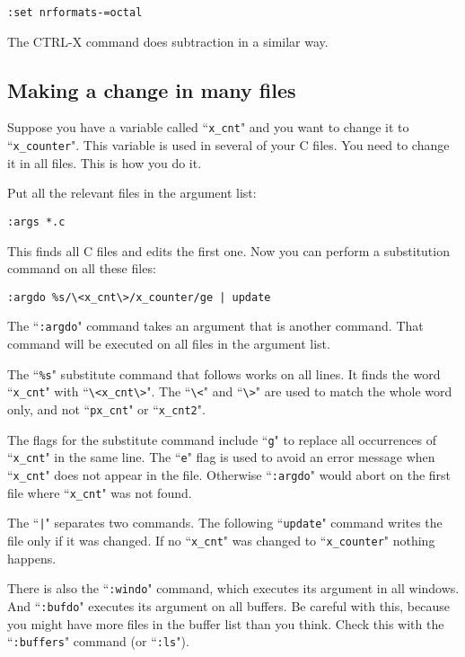 \begin{Verbatim}[samepage=true]
 :set nrformats-=octal
\end{Verbatim}

The CTRL-X command does subtraction in a similar way.
\subsection{Making a change in many files}
Suppose you have a variable called ``\texttt{x\_cnt}" and you want to change it to ``\texttt{x\_counter}".
This variable is used in several of your C files.
You need to change it in all files.
This is how you do it.

Put all the relevant files in the argument list:

\begin{Verbatim}[samepage=true]
 :args *.c
\end{Verbatim}

This finds all C files and edits the first one.
Now you can perform a substitution command on all these files:

\begin{Verbatim}[samepage=true]
 :argdo %s/\<x_cnt\>/x_counter/ge | update
\end{Verbatim}

The ``\texttt{:argdo}" command takes an argument that is another command.
That command will be executed on all files in the argument list.

The ``\texttt{\%s}" substitute command that follows works on all lines.
It finds the word ``\texttt{x\_cnt}" with ``\texttt{\textbackslash<x\_cnt\textbackslash>}".
The ``\texttt{\textbackslash<}" and ``\texttt{\textbackslash>}" are used to match the whole word only, and not ``\texttt{px\_cnt}" or ``\texttt{x\_cnt2}".

The flags for the substitute command include ``\texttt{g}" to replace all occurrences of ``\texttt{x\_cnt}" in the same line.
The ``\texttt{e}" flag is used to avoid an error message when ``\texttt{x\_cnt}" does not appear in the file.
Otherwise ``\texttt{:argdo}" would abort on the first file where ``\texttt{x\_cnt}" was not found.

The ``\texttt{|}" separates two commands.
The following ``\texttt{update}" command writes the file only if it was changed.
If no ``\texttt{x\_cnt}" was changed to ``\texttt{x\_counter}" nothing happens.

There is also the ``\texttt{:windo}" command, which executes its argument in all windows.
And ``\texttt{:bufdo}" executes its argument on all buffers.
Be careful with this, because you might have more files in the buffer list than you think.
Check this with the ``\texttt{:buffers}" command (or ``\texttt{:ls}").
